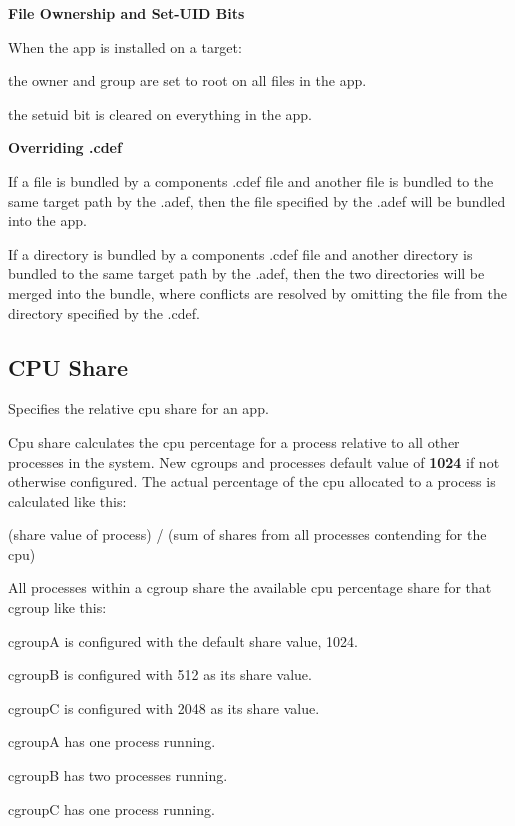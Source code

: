 {\bfseries File Ownership and Set-\/\+U\+I\+D Bits}

When the app is installed on a target\+: ~\newline

\begin{DoxyItemize}
\item the owner and group are set to {\ttfamily root} on all files in the app.
\item the {\ttfamily setuid} bit is cleared on everything in the app.
\end{DoxyItemize}

{\bfseries Overriding .cdef}

If a file is bundled by a component\textquotesingle{}s .cdef file and another file is bundled to the same target path by the .adef, then the file specified by the .adef will be bundled into the app.

If a directory is bundled by a component\textquotesingle{}s .cdef file and another directory is bundled to the same target path by the .adef, then the two directories will be merged into the bundle, where conflicts are resolved by omitting the file from the directory specified by the .cdef.\hypertarget{def_files_adef_defFilesAdef_cpuShare}{}\subsection{C\+P\+U Share}\label{def_files_adef_defFilesAdef_cpuShare}
Specifies the relative cpu share for an app.

Cpu share calculates the cpu percentage for a process relative to all other processes in the system. New cgroups and processes default value of {\bfseries 1024} if not otherwise configured. The actual percentage of the cpu allocated to a process is calculated like this\+:

(share value of process) / (sum of shares from all processes contending for the cpu)

All processes within a cgroup share the available cpu percentage share for that cgroup like this\+:


\begin{DoxyItemize}
\item cgroup\+A is configured with the default share value, 1024.
\item cgroup\+B is configured with 512 as its share value.
\item cgroup\+C is configured with 2048 as its share value.
\item cgroup\+A has one process running.
\item cgroup\+B has two processes running.
\item cgroup\+C has one process running.
\end{DoxyItemize}

